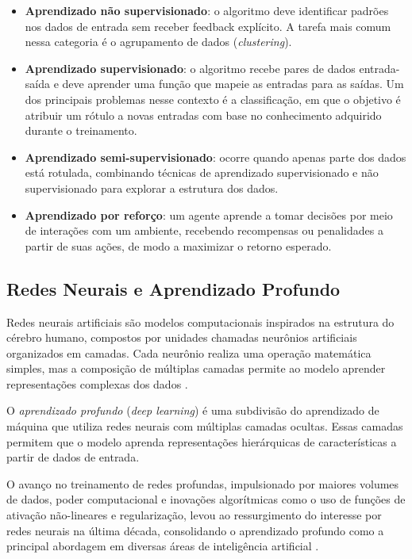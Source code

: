 \documentclass[12pt]{article}
\begin{document}
\begin{itemize}
    \item \textbf{Aprendizado não supervisionado}: o algoritmo deve identificar padrões nos dados de entrada sem receber feedback explícito. A tarefa mais comum nessa categoria é o agrupamento de dados (\textit{clustering}).
    
    \item \textbf{Aprendizado supervisionado}: o algoritmo recebe pares de dados entrada-saída e deve aprender uma função que mapeie as entradas para as saídas. Um dos principais problemas nesse contexto é a classificação, em que o objetivo é atribuir um rótulo a novas entradas com base no conhecimento adquirido durante o treinamento.
    
    \item \textbf{Aprendizado semi-supervisionado}: ocorre quando apenas parte dos dados está rotulada, combinando técnicas de aprendizado supervisionado e não supervisionado para explorar a estrutura dos dados.
    
    \item \textbf{Aprendizado por reforço}: um agente aprende a tomar decisões por meio de interações com um ambiente, recebendo recompensas ou penalidades a partir de suas ações, de modo a maximizar o retorno esperado.
\end{itemize}

\subsection{Redes Neurais e Aprendizado Profundo}
\label{sec:review:deep_learning}

Redes neurais artificiais são modelos computacionais inspirados na estrutura do cérebro humano, compostos por unidades chamadas neurônios artificiais organizados em camadas. Cada neurônio realiza uma operação matemática simples, mas a composição de múltiplas camadas permite ao modelo aprender representações complexas dos dados \cite{goodfellow2016}.

O \textit{aprendizado profundo} (\textit{deep learning}) é uma subdivisão do aprendizado de máquina que utiliza redes neurais com múltiplas camadas ocultas. Essas camadas permitem que o modelo aprenda representações hierárquicas de características a partir de dados de entrada.

O avanço no treinamento de redes profundas, impulsionado por maiores volumes de dados, poder computacional e inovações algorítmicas como o uso de funções de ativação não-lineares e regularização, levou ao ressurgimento do interesse por redes neurais na última década, consolidando o aprendizado profundo como a principal abordagem em diversas áreas de inteligência artificial \cite{goodfellow2016}.
\end{document}
